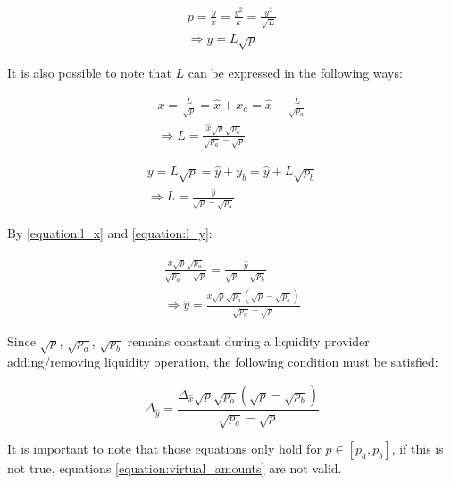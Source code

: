 \documentclass{article}
\begin{document}
\begin{equation}
\label{equation:y}
    \begin{split}
        p=\frac{y}{x}=\frac{y^2}{k}=\frac{y^2}{\sqrt{L}} \\
        \Rightarrow y=L\sqrt{p}
    \end{split}
\end{equation}

It is also possible to note that $L$ can be expressed in the following ways:

\begin{equation}
    \label{equation:l_x}
    \begin{split}
        x=\frac{L}{\sqrt{p}}=\hat{x} + x_a = \hat{x} + \frac{L}{\sqrt{p_a}} \\
        \Rightarrow L=\frac{\hat{x}\sqrt{p}\sqrt{p_a}}{\sqrt{p_a} - \sqrt{p}}
    \end{split}
\end{equation}

\begin{equation}
    \label{equation:l_y}
    \begin{split}
        y=L\sqrt{p}=\hat{y} + y_b = \hat{y} + L\sqrt{p_b} \\
        \Rightarrow L=\frac{\hat{y}}{\sqrt{p} - \sqrt{p_b}}
    \end{split}
\end{equation}

By \ref{equation:l_x} and \ref{equation:l_y}:

\begin{equation}
    \label{equation:real_x_y}
    \begin{split}
        \frac{\hat{x}\sqrt{p}\sqrt{p_a}}{\sqrt{p_a} - \sqrt{p}} = \frac{\hat{y}}{\sqrt{p} - \sqrt{p_b}} \\
        \Rightarrow \hat{y}=\frac{\hat{x}\sqrt{p}\sqrt{p_a}(\sqrt{p}-\sqrt{p_b})}{\sqrt{p_a}-\sqrt{p}}
    \end{split}
\end{equation}

Since $\sqrt{p}$, $\sqrt{p_a}$, $\sqrt{p_b}$ remains constant during a liquidity provider adding/removing liquidity operation, the following condition must be satisfied:

\begin{equation}
    \Delta_{\hat{y}}=\frac{\Delta_{\hat{x}}\sqrt{p}\sqrt{p_a}(\sqrt{p}-\sqrt{p_b})}{\sqrt{p_a}-\sqrt{p}}
\end{equation}

It is important to note that those equations only hold for $p \in [p_a, p_b]$, if this is not true, equations \ref{equation:virtual_amounts} are not valid.
\end{document}
